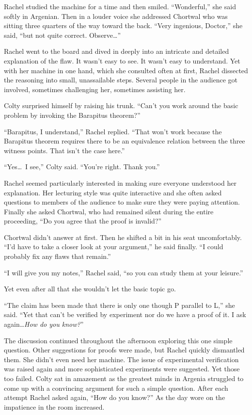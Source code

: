 Rachel studied the machine for a time and then smiled. ``Wonderful,'' she said softly in
Argenian. Then in a louder voice she addressed Chortwal who was sitting three quarters of the
way toward the back. ``Very ingenious, Doctor,'' she said, ``but not quite correct.
Observe\ldots''

Rachel went to the board and dived in deeply into an intricate and detailed explanation of the
flaw. It wasn't easy to see. It wasn't easy to understand. Yet with her machine in one
hand, which she consulted often at first, Rachel dissected the reasoning into small,
unassailable steps. Several people in the audience got involved, sometimes challenging her,
sometimes assisting her.

Colty surprised himself by raising his trunk. ``Can't you work around the basic problem by
invoking the Barapitus theorem?''

``Barapitus, I understand,'' Rachel replied. ``That won't work because the Barapitus
theorem requires there to be an equivalence relation between the three witness points. That
isn't the case here.''

``Yes\ldots\ I see,'' Colty said. ``You're right. Thank you.''

Rachel seemed particularly interested in making sure everyone understood her explanation. Her
lecturing style was quite interactive and she often asked questions to members of the audience
to make sure they were paying attention. Finally she asked Chortwal, who had remained silent
during the entire proceeding, ``Do you agree that the proof is invalid?''

Chortwal didn't answer at first. Then he shifted a bit in his seat uncomfortably. ``I'd have to
take a closer look at your argument,'' he said finally. ``I could probably fix any flaws that
remain.''

``I will give you my notes,'' Rachel said, ``so you can study them at your leisure.''

Yet even after all that she wouldn't let the basic topic go.

``The claim has been made that there is only one though P parallel to L,'' she said. ``Yet that
can't be verified by experiment nor do we have a proof of it. I ask again\ldots \emph{How do you
  know?}''

The discussion continued throughout the afternoon exploring this one simple question. Other
suggestions for proofs were made, but Rachel quickly dismantled them. She didn't even need her
machine. The issue of experimental verification was raised again and more sophisticated
experiments were suggested. Yet those too failed. Colty sat in amazement as the greatest minds
in Argenia struggled to come up with a convincing argument for such a simple question. After
each attempt Rachel asked again, ``How do you know?'' As the day wore on the impatience in the
room increased.

